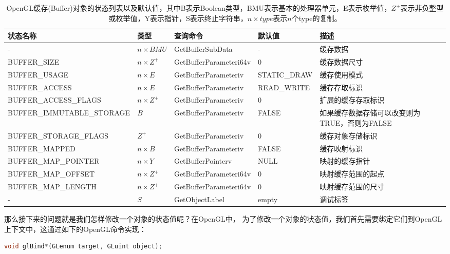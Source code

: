 \begin{table}
\begin{fullwidth}
\caption{OpenGL缓存(Buffer)对象的状态列表以及默认值，其中B表示Boolean类型，BMU表示基本的处理器单元，E表示枚举值，$Z^{+}$表示非负整型或枚举值，Y表示指针，S表示终止字符串，$n\times type$表示$n$个type的复制。}
\label{t:api-buffer-state}
\centering
\begin{tabular}{>{\scriptsize}p{0.29\thewidth}|>{\small}P{0.08\thewidth}|>{\small}P{0.21\thewidth}|>{\scriptsize}P{0.13\thewidth}|>{\small}p{0.25\thewidth}}
\hline 
   状态名称&类型&查询命令&默认值&描述  \\
    \hline  
  -& $n\times BMU$ & GetBufferSubData&-&缓存数据\\
  BUFFER\_SIZE& $n\times Z^{+}$ & GetBufferParameteri64v&0&缓存数据尺寸\\
  BUFFER\_USAGE& $n\times E$ & GetBufferParameteriv&STATIC\_DRAW&缓存使用模式\\
  BUFFER\_ACCESS& $n\times E$ & GetBufferParameteriv&READ\_WRITE&缓存存取标识\\
  BUFFER\_ACCESS\_FLAGS& $n\times Z^{+}$ & GetBufferParameteriv&0&扩展的缓存存取标识\\
  BUFFER\_IMMUTABLE\_STORAGE& $B$ & GetBufferParameteriv&FALSE&如果缓存数据存储可以改变则为TRUE，否则为FALSE\\
  BUFFER\_STORAGE\_FLAGS& $Z^{+}$ & GetBufferParameteriv&0&缓存对象存储标识\\
  BUFFER\_MAPPED& $n\times B$ & GetBufferParameteriv&FALSE&缓存映射标识\\
  BUFFER\_MAP\_POINTER& $n\times Y$ & GetBufferPointerv&NULL&映射的缓存指针\\
  BUFFER\_MAP\_OFFSET& $n\times Z^{+}$ & GetBufferParameteri64v&0&映射缓存范围的起点\\
  BUFFER\_MAP\_LENGTH& $n\times Z^{+}$ & GetBufferParameteri64v&0&映射缓存范围的尺寸\\
  -& $S$ & GetObjectLabel&empty&调试标签\\

 \hline 
\end{tabular}
\end{fullwidth}
\end{table}


那么接下来的问题就是我们怎样修改一个对象的状态值呢？在OpenGL中， 为了修改一个对象的状态值，我们首先需要绑定它们到OpenGL上下文中，这通过如下的OpenGL命令实现：

\begin{lstlisting}[language=C++]
void glBind*(GLenum target​, GLuint object​);
\end{lstlisting}

